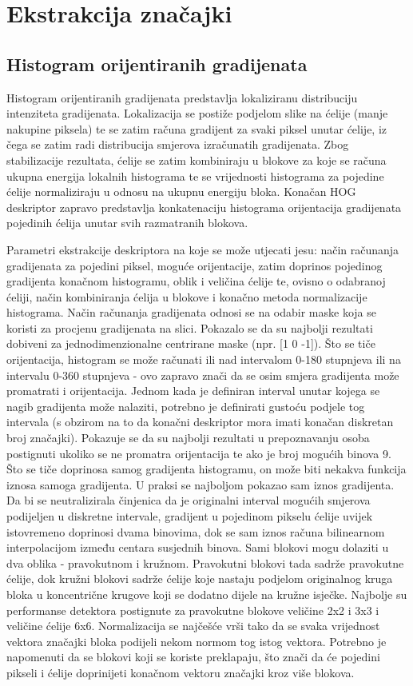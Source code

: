 \documentclass[utf8, seminar, numeric, times]{fer}
\begin{document}
\section{Ekstrakcija značajki}
\subsection{Histogram orijentiranih gradijenata}
Histogram orijentiranih gradijenata predstavlja lokaliziranu distribuciju intenziteta gradijenata. Lokalizacija se postiže podjelom slike na ćelije (manje nakupine piksela) te se zatim računa gradijent za svaki piksel unutar ćelije, iz čega se zatim radi distribucija smjerova izračunatih gradijenata. Zbog stabilizacije rezultata, ćelije se zatim kombiniraju u blokove za koje se računa ukupna energija lokalnih histograma te se vrijednosti histograma za pojedine ćelije normaliziraju u odnosu na ukupnu energiju bloka. Konačan HOG deskriptor zapravo predstavlja konkatenaciju histograma orijentacija gradijenata pojedinih ćelija unutar svih razmatranih blokova.

Parametri ekstrakcije deskriptora na koje se može utjecati jesu: način računanja gradijenata za pojedini piksel, moguće orijentacije, zatim doprinos pojedinog gradijenta konačnom histogramu, oblik i veličina ćelije te, ovisno o odabranoj ćeliji, način kombiniranja ćelija u blokove i konačno metoda normalizacije histograma. Način računanja gradijenata odnosi se na odabir maske koja se koristi  za procjenu gradijenata na slici. Pokazalo se da su najbolji rezultati dobiveni za jednodimenzionalne centrirane maske (npr. [1 0 -1]). Što se tiče orijentacija, histogram se može računati ili nad intervalom 0-180  stupnjeva ili na intervalu 0-360 stupnjeva - ovo zapravo znači da se osim smjera gradijenta može promatrati i orijentacija. Jednom kada je definiran interval unutar kojega se nagib gradijenta može nalaziti, potrebno je definirati gustoću podjele tog intervala (s obzirom na to da konačni deskriptor mora imati konačan diskretan broj značajki). Pokazuje se da su najbolji rezultati u prepoznavanju osoba postignuti ukoliko se ne promatra orijentacija te ako je broj mogućih binova 9. Što se tiče doprinosa samog gradijenta histogramu, on može biti nekakva funkcija iznosa samoga gradijenta. U praksi se najboljom pokazao sam iznos gradijenta. Da bi se neutralizirala činjenica da je originalni interval mogućih smjerova podijeljen u diskretne intervale, gradijent u pojedinom pikselu ćelije uvijek istovremeno doprinosi dvama binovima, dok se sam iznos računa bilinearnom interpolacijom između centara susjednih binova. Sami blokovi mogu dolaziti u dva oblika - pravokutnom i kružnom. Pravokutni blokovi tada sadrže pravokutne ćelije, dok kružni blokovi sadrže ćelije koje nastaju podjelom originalnog kruga bloka u koncentrične krugove koji se dodatno dijele na kružne isječke. Najbolje su performanse detektora postignute za pravokutne blokove veličine 2x2 i 3x3 i veličine ćelije 6x6. Normalizacija se najčešće vrši tako da se svaka vrijednost vektora značajki bloka podijeli nekom normom tog istog vektora.  Potrebno je napomenuti da se blokovi koji se koriste preklapaju, što znači da će pojedini pikseli i ćelije doprinijeti konačnom vektoru značajki kroz više blokova.
\end{document}
